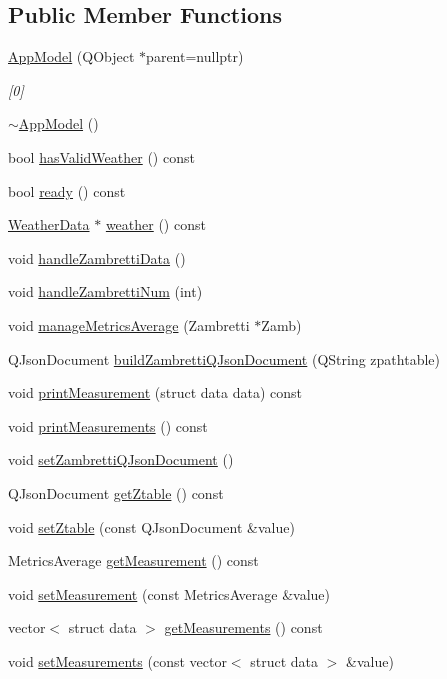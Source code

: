 \subsection*{Public Member Functions}
\begin{DoxyCompactItemize}
\item 
\hyperlink{class_app_model_a14293f7293e1bcbfdb5499789f9e134b}{App\+Model} (Q\+Object $\ast$parent=nullptr)
\begin{DoxyCompactList}\small\item\em \mbox{[}0\mbox{]} \end{DoxyCompactList}\item 
\hyperlink{class_app_model_a67ab3004ccbe2822a8a0abb9fa96ace3}{$\sim$\+App\+Model} ()
\item 
bool \hyperlink{class_app_model_a6ec5b34a1839a7141979709418174ad1}{has\+Valid\+Weather} () const
\item 
bool \hyperlink{class_app_model_a3917fdc3dd8c97715991d9fd1a23abcc}{ready} () const
\item 
\hyperlink{class_weather_data}{Weather\+Data} $\ast$ \hyperlink{class_app_model_a70a5bec8e359e4edbd16611efa96cf32}{weather} () const
\item 
void \hyperlink{class_app_model_a99a784aac19e82ccc6c0dd0509b4ea04}{handle\+Zambretti\+Data} ()
\item 
void \hyperlink{class_app_model_a75d2b6e818885a77f1b1dd56fc3c9cd3}{handle\+Zambretti\+Num} (int)
\item 
void \hyperlink{class_app_model_a91f558862aad6b2509f03e49b549270e}{manage\+Metrics\+Average} (Zambretti $\ast$Zamb)
\item 
Q\+Json\+Document \hyperlink{class_app_model_a2e738230cd01012b529adadc3f7c4eae}{build\+Zambretti\+Q\+Json\+Document} (Q\+String zpathtable)
\item 
void \hyperlink{class_app_model_a2bb0474a4f5f73ca23f9f72c97912192}{print\+Measurement} (struct data data) const
\item 
void \hyperlink{class_app_model_ac60073d6c96f7471f7227be130033399}{print\+Measurements} () const
\item 
void \hyperlink{class_app_model_a18bdf8b2328b6d64e2315b5e8027f07e}{set\+Zambretti\+Q\+Json\+Document} ()
\item 
Q\+Json\+Document \hyperlink{class_app_model_a1e221ad7947cc08e85078416afc5a593}{get\+Ztable} () const
\item 
void \hyperlink{class_app_model_ad4f010e1e4244d90cd648c6806dcda4e}{set\+Ztable} (const Q\+Json\+Document \&value)
\item 
Metrics\+Average \hyperlink{class_app_model_ac9dff9ffdd21a1749d2461c3d2587f6a}{get\+Measurement} () const
\item 
void \hyperlink{class_app_model_af8e28b32ab4d33c6f10bcab5d9c5b25c}{set\+Measurement} (const Metrics\+Average \&value)
\item 
vector$<$ struct data $>$ \hyperlink{class_app_model_aeb65a362d2a2875ed038dc1ae359a337}{get\+Measurements} () const
\item 
void \hyperlink{class_app_model_ad78b2a410448a33eb9913cebfa64d32d}{set\+Measurements} (const vector$<$ struct data $>$ \&value)
\end{DoxyCompactItemize}
